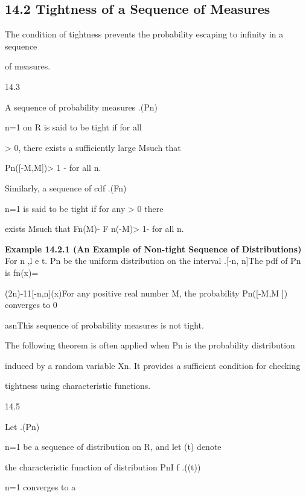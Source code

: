 \subsection*{14.2 Tightness of a Sequence of Measures}

The condition of tightness prevents the probability escaping to infinity in a sequence

of measures.

\begin{defbox}{14.3}
\end{defbox}

A sequence of probability measures .(Pn)\infty

n=1 on R is said to be tight if for all

\epsilon> 0, there exists a sufficiently large M\epsilon such that

Pn([-M\epsilon,M\epsilon])> 1 - \epsilon for all n.

Similarly, a sequence of cdf .(Fn)\infty

n=1 is said to be tight if for any \epsilon> 0 there

exists M\epsilon such that Fn(M\epsilon)- F n(-M\epsilon)> 1- \epsilon for all n.

\textbf{Example 14.2.1 (An Example of Non-tight Sequence of Distributions)} \\

For n ,l e t. Pn be the uniform distribution on the interval .[-n, n]The pdf of Pn is fn(x)=

(2n)-11[-n,n](x)For any positive real number M, the probability Pn([-M,M ]) converges to 0

asn\to\infty This sequence of probability measures is not tight.

The following theorem is often applied when Pn is the probability distribution

induced by a random variable Xn. It provides a sufficient condition for checking

tightness using characteristic functions.

\begin{thmbox}{14.5}
\end{thmbox}

Let .(Pn)\infty

n=1 be a sequence of distribution on R, and let \phin(t) denote

the characteristic function of distribution PnI f .(\phin(t))\infty

n=1 converges to a

